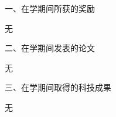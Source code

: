 ﻿\begin{achievement}
一、在学期间所获的奖励 %
\par 
无
\par
二、在学期间发表的论文 %
\par
无
\par
三、在学期间取得的科技成果 %
\par
无
\end{achievement}
